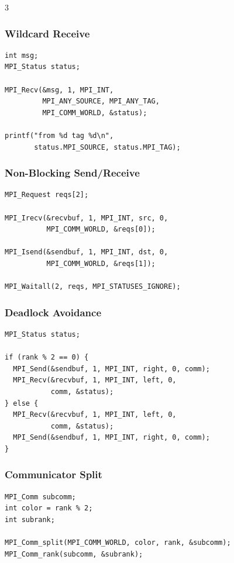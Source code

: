 \documentclass[12pt, a4paper]{article}
\begin{document}
\begin{multicols*}{3}
\subsubsection{Wildcard Receive}
\begin{lstlisting}[basicstyle=\ttfamily\scriptsize]
int msg;
MPI_Status status;

MPI_Recv(&msg, 1, MPI_INT,
         MPI_ANY_SOURCE, MPI_ANY_TAG,
         MPI_COMM_WORLD, &status);

printf("from %d tag %d\n",
       status.MPI_SOURCE, status.MPI_TAG);
\end{lstlisting}

\subsubsection{Non-Blocking Send/Receive}
\begin{lstlisting}[basicstyle=\ttfamily\scriptsize]
MPI_Request reqs[2];

MPI_Irecv(&recvbuf, 1, MPI_INT, src, 0,
          MPI_COMM_WORLD, &reqs[0]);

MPI_Isend(&sendbuf, 1, MPI_INT, dst, 0,
          MPI_COMM_WORLD, &reqs[1]);

MPI_Waitall(2, reqs, MPI_STATUSES_IGNORE);
\end{lstlisting}

\colbreak

\subsubsection{Deadlock Avoidance}
\begin{lstlisting}[basicstyle=\ttfamily\scriptsize]
MPI_Status status;

if (rank % 2 == 0) {
  MPI_Send(&sendbuf, 1, MPI_INT, right, 0, comm);
  MPI_Recv(&recvbuf, 1, MPI_INT, left, 0,
           comm, &status);
} else {
  MPI_Recv(&recvbuf, 1, MPI_INT, left, 0,
           comm, &status);
  MPI_Send(&sendbuf, 1, MPI_INT, right, 0, comm);
}
\end{lstlisting}

\subsubsection{Communicator Split}
\begin{lstlisting}[basicstyle=\ttfamily\scriptsize]
MPI_Comm subcomm;
int color = rank % 2;
int subrank;

MPI_Comm_split(MPI_COMM_WORLD, color, rank, &subcomm);
MPI_Comm_rank(subcomm, &subrank);


\end{lstlisting}
\end{multicols*}
\end{document}
